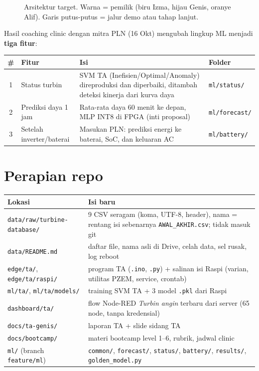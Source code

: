 \documentclass[10.5pt,a4paper]{article}
\newcommand{\diagram}[1]{}
\newcommand{\cmd}[1]{\texttt{#1}}
\begin{document}
\begin{figure}[h]
\centering\resizebox{\linewidth}{!}{\diagram{arsitektur}}
\caption{Arsitektur target. Warna = pemilik (biru Izma, hijau Genis, oranye Alif). Garis putus-putus = jalur demo atau tahap lanjut.}
\label{fig:arsitektur}
\end{figure}

Hasil coaching clinic dengan mitra PLN (16 Okt) mengubah lingkup ML menjadi \textbf{tiga fitur}:

\begin{center}
\begin{tabularx}{\linewidth}{@{}c l X l@{}}
\toprule
\# & Fitur & Isi & Folder \\
\midrule
1 & Status turbin & SVM TA (Inefisien/Optimal/Anomaly) direproduksi dan diperbaiki, ditambah deteksi kinerja dari kurva daya & \cmd{ml/status/} \\
2 & Prediksi daya 1 jam & Rata-rata daya 60 menit ke depan, MLP INT8 di FPGA (inti proposal) & \cmd{ml/forecast/} \\
3 & Setelah inverter/baterai & Masukan PLN: prediksi energi ke baterai, SoC, dan keluaran AC & \cmd{ml/battery/} \\
\bottomrule
\end{tabularx}
\end{center}

\section{Perapian repo}
\begin{center}
\small
\begin{tabularx}{\linewidth}{@{}l X@{}}
\toprule
Lokasi & Isi baru \\
\midrule
\cmd{data/raw/turbine-database/} & 9 CSV seragam (koma, UTF-8, header), nama = rentang isi sebenarnya \cmd{AWAL\_AKHIR.csv}; tidak masuk git \\
\cmd{data/README.md} & daftar file, nama asli di Drive, celah data, sel rusak, log reboot \\
\cmd{edge/ta/}, \cmd{edge/ta/raspi/} & program TA (\cmd{.ino}, \cmd{.py}) + salinan isi Raspi (varian, utilitas PZEM, service, crontab) \\
\cmd{ml/ta/}, \cmd{ml/ta/models/} & training SVM TA + 3 model \cmd{.pkl} dari Raspi \\
\cmd{dashboard/ta/} & flow Node-RED \emph{Turbin angin} terbaru dari server (65 node, tanpa kredensial) \\
\cmd{docs/ta-genis/} & laporan TA + slide sidang TA \\
\cmd{docs/bootcamp/} & materi bootcamp level 1--6, rubrik, jadwal clinic \\
\cmd{ml/} (branch \cmd{feature/ml}) & \cmd{common/}, \cmd{forecast/}, \cmd{status/}, \cmd{battery/}, \cmd{results/}, \cmd{golden\_model.py} \\
\bottomrule
\end{tabularx}
\end{center}
\end{document}
